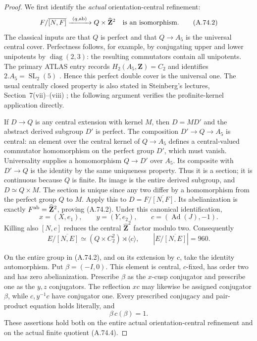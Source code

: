 \begin{proof}
We first identify the \emph{actual} orientation-central refinement:
\[
 F/\overline{[N,F]}
   \xrightarrow{\ (q,\operatorname{ab})\ }
 Q\times\widehat{\mathbf Z}^{2}
 \quad\hbox{is an isomorphism.}
 \tag{A.74.2}
\]
The classical inputs are that \(Q\) is perfect and that
\(Q\to A_5\) is the universal central cover. Perfectness follows,
for example, by conjugating upper and lower unipotents by
\(\operatorname{diag}(2,3)\): the resulting commutators contain
all unipotents. The primary ATLAS entry records
\(H_2(A_5,\mathbf Z)=C_2\) and identifies
\(2.A_5=\operatorname{SL}_2(5)\)
\cite{CEATLASA5}. Hence this perfect double cover is the universal
one. The usual centrally closed property is also stated in
Steinberg's lectures, Section~7(vii)--(viii)
\cite{CESteinberg1967Central}; the following argument verifies the
profinite-kernel application directly.

If \(D\to Q\) is any central extension with kernel \(M\), then
\(D=M D'\) and the abstract derived subgroup \(D'\) is perfect.
The composition \(D'\to Q\to A_5\) is central: an element over
the central kernel of \(Q\to A_5\) defines a central-valued
commutator homomorphism on the perfect group \(D'\), which must
vanish. Universality supplies a homomorphism \(Q\to D'\) over
\(A_5\). Its composite with \(D'\to Q\) is the identity by
the same uniqueness property. Thus it is a section; it is continuous
because \(Q\) is finite. Its image is the entire derived subgroup,
and \(D\simeq Q\times M\). The section is unique since any two
differ by a homomorphism from the perfect group \(Q\) to \(M\).
Apply this to \(D=F/\overline{[N,F]}\). Its abelianization is
exactly \(F^{\rm ab}=\widehat{\mathbf Z}^{2}\), proving
(A.74.2). Under this canonical identification,
\[
 x=(X,e_1),\qquad y=(Y,e_2),\qquad
 c=(\operatorname{Ad}(J),-1).
 \tag{A.74.3}
\]
Killing also \([N,c]\) reduces the central
\(\widehat{\mathbf Z}^{2}\) factor modulo two. Consequently
\[
 E/\overline{[N,E]}
 \simeq (Q\times C_2^2)\rtimes\langle c\rangle,
 \qquad |E/\overline{[N,E]}|=960.
 \tag{A.74.4}
\]

On the entire group in (A.74.2), and on its extension by \(c\),
take the identity automorphism. Put
\(\beta=(-I,0)\). This element is central, \(c\)-fixed, has
order two and has zero abelianization. Prescribe \(\beta\) as
the \(x\)-cusp conjugator and prescribe one as the \(y,z\)
conjugators. The reflection \(xc\) may likewise be assigned
conjugator \(\beta\), while \(c,y^{-1}c\) have conjugator one.
Every prescribed conjugacy and pair-product equation holds literally,
and
\[
 \beta\,c(\beta)=1.
 \tag{A.74.5}
\]
These assertions hold both on the entire actual orientation-central
refinement and on the actual finite quotient (A.74.4).


\end{proof}
